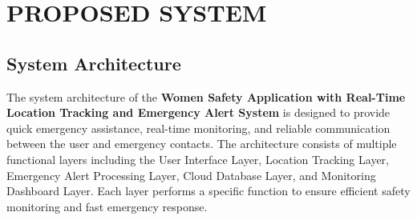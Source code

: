 \documentclass[a4paper,12pt]{report}
\begin{document}
\chapter{PROPOSED SYSTEM}

\section{System Architecture}

\par The system architecture of the \textbf{Women Safety Application with Real-Time Location Tracking and Emergency Alert System} is designed to provide quick emergency assistance, real-time monitoring, and reliable communication between the user and emergency contacts. The architecture consists of multiple functional layers including the User Interface Layer, Location Tracking Layer, Emergency Alert Processing Layer, Cloud Database Layer, and Monitoring Dashboard Layer. Each layer performs a specific function to ensure efficient safety monitoring and fast emergency response.
\end{document}
